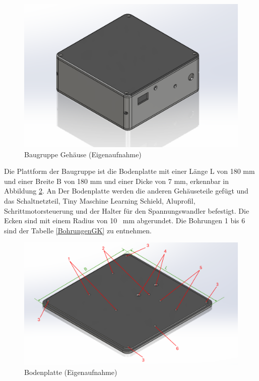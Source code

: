 \begin{figure}[H]
	\begin{center}
		\includegraphics[width=\textwidth]{Images/Konstruktion/GehaeuseK.png}
		\caption{Baugruppe Gehäuse (Eigenaufnahme)} \label{GehK}
	\end{center}
\end{figure}

Die Plattform der Baugruppe ist die Bodenplatte mit einer Länge L von 180 mm und einer Breite B von 180 mm und einer Dicke von 7 mm, erkennbar in Abbildung \ref{BodenK}. An Der Bodenplatte werden die anderen Gehäuseteile gefügt und das Schaltnetzteil, Tiny Maschine Learning Schield, Aluprofil, Schrittmotorsteuerung und der Halter für den Spannungswandler befestigt. Die Ecken sind mit einem Radius von 10 \ mm abgerundet. Die Bohrungen 1 bis 6 sind der Tabelle \ref{BohrungenGK} zu entnehmen.

\begin{figure}[H]
	\begin{center}
		\includegraphics[width=\textwidth]{Images/Konstruktion/BodenK.png}
		\caption{Bodenplatte (Eigenaufnahme)} \label{BodenK}
	\end{center}
\end{figure}

